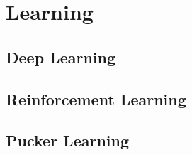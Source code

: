 \newpage

\chapter{Learning}
\label{chap:learning}

\section{Deep Learning}
\label{sec:deep-learning}

\section{Reinforcement Learning}
\label{sec:reinforcement-learning}


\section{Pucker Learning}
\label{sec:pucker-learning}



